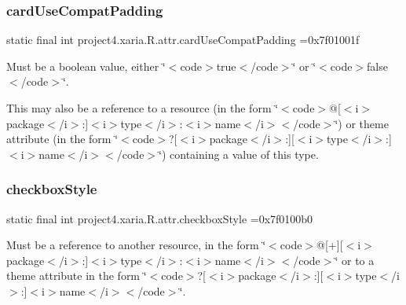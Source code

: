 \subsubsection{\texorpdfstring{card\+Use\+Compat\+Padding}{cardUseCompatPadding}}
{\footnotesize\ttfamily static final int project4.\+xaria.\+R.\+attr.\+card\+Use\+Compat\+Padding =0x7f01001f\hspace{0.3cm}{\ttfamily [static]}}

Must be a boolean value, either \char`\"{}$<$code$>$true$<$/code$>$\char`\"{} or \char`\"{}$<$code$>$false$<$/code$>$\char`\"{}. 

This may also be a reference to a resource (in the form \char`\"{}$<$code$>$@\mbox{[}$<$i$>$package$<$/i$>$\+:\mbox{]}$<$i$>$type$<$/i$>$\+:$<$i$>$name$<$/i$>$$<$/code$>$\char`\"{}) or theme attribute (in the form \char`\"{}$<$code$>$?\mbox{[}$<$i$>$package$<$/i$>$\+:\mbox{]}\mbox{[}$<$i$>$type$<$/i$>$\+:\mbox{]}$<$i$>$name$<$/i$>$$<$/code$>$\char`\"{}) containing a value of this type. \mbox{\label{classproject4_1_1xaria_1_1R_1_1attr_ac94b7c28855c39d9a2ca2949d5c219df}} 
\subsubsection{\texorpdfstring{checkbox\+Style}{checkboxStyle}}
{\footnotesize\ttfamily static final int project4.\+xaria.\+R.\+attr.\+checkbox\+Style =0x7f0100b0\hspace{0.3cm}{\ttfamily [static]}}

Must be a reference to another resource, in the form \char`\"{}$<$code$>$@\mbox{[}+\mbox{]}\mbox{[}$<$i$>$package$<$/i$>$\+:\mbox{]}$<$i$>$type$<$/i$>$\+:$<$i$>$name$<$/i$>$$<$/code$>$\char`\"{} or to a theme attribute in the form \char`\"{}$<$code$>$?\mbox{[}$<$i$>$package$<$/i$>$\+:\mbox{]}\mbox{[}$<$i$>$type$<$/i$>$\+:\mbox{]}$<$i$>$name$<$/i$>$$<$/code$>$\char`\"{}. \mbox{\label{classproject4_1_1xaria_1_1R_1_1attr_a7ec43308b6effc0e0b4e88e0961b9e1c}} 
